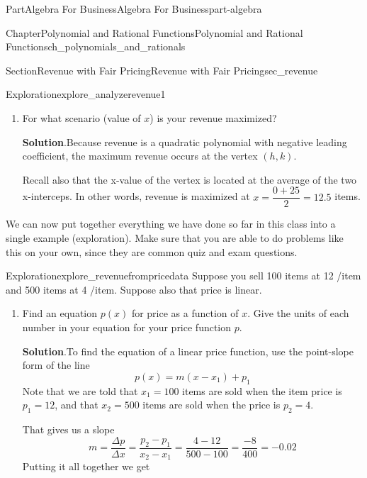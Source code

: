 \documentclass[oneside,10pt,]{tufte-book}
\newcommand{\blocktitlefont}{\relax}
\numberwithin{equation}{chapter}
\begin{document}
\begin{partptx}{Part}{Algebra For Business}{}{Algebra For Business}{}{}{part-algebra}
\begin{chapterptx}{Chapter}{Polynomial and Rational Functions}{}{Polynomial and Rational Functions}{}{}{ch_polynomials_and_rationals}
\begin{sectionptx}{Section}{Revenue with Fair Pricing}{}{Revenue with Fair Pricing}{}{}{sec_revenue}
\begin{exploration}{Exploration}{}{explore_analyzerevenue1}
\begin{enumerate}[font=\bfseries,label=(\alph*),ref=\alph*]
\begin{image}{0.25}{0.5}{0.25}{}
{
}%
\end{image}%
\item{}For what scenario (value of \(x\)) is your revenue maximized?%
\par\smallskip%
\noindent\textbf{\blocktitlefont Solution}.\hypertarget{explore_analyzerevenue1-4-2}{}\quad{}Because revenue is a quadratic polynomial with negative leading coefficient, the maximum revenue occurs at the vertex \((h,k)\).%
\par
Recall also that the x-value of the vertex is located at the average of the two x-interceps.  In other words, revenue is maximized at \(x=\dfrac{0+25}{2} = 12.5\) items.%
\end{enumerate}%
\end{exploration}%
We can now put together everything we have done so far in this class into a single example (exploration). Make sure that you are able to do problems like this on your own, since they are common quiz and exam questions.%
\begin{exploration}{Exploration}{}{explore_revenuefrompricedata}%
Suppose you sell 100 items at 12 \textdollar{}\slash{}item and 500 items at 4 \textdollar{}\slash{}item.  Suppose also that price is linear.%
\begin{enumerate}[font=\bfseries,label=(\alph*),ref=\alph*]%
\item{}Find an equation \(p(x)\) for price as a function of \(x\). Give the units of each number in your equation for your price function \(p\).%
\par\smallskip%
\noindent\textbf{\blocktitlefont Solution}.\hypertarget{explore_revenuefrompricedata-2-2}{}\quad{}To find the equation of a linear price function, use the point-slope form of the line%
\begin{equation*}
p(x) = m (x-x_1) + p_1
\end{equation*}
Note that we are told that \(x_1=100\) items are sold when the item price is \(p_1=12\), and that \(x_2=500\) items are sold when the price is \(p_2=4\).%
\par
That gives us a slope%
\begin{equation*}
m = \dfrac{\Delta p}{\Delta x} = \dfrac{p_2-p_1}{x_2-x_1} = \dfrac{4-12}{500-100} = \dfrac{-8}{400} = -0.02
\end{equation*}
Putting it all together we get%
\begin{equation*}

\end{equation*}
\end{enumerate}
\end{exploration}
\end{sectionptx}
\end{chapterptx}
\end{partptx}
\end{document}

